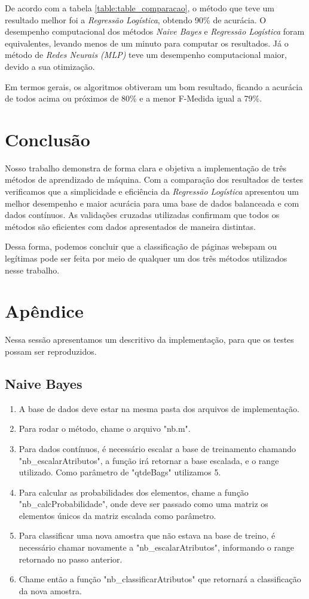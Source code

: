 \documentclass[10pt, conference, compsocconf]{IEEEtran}
\begin{document}
De acordo com a tabela \ref{table:table_comparacao}, o método que teve um resultado melhor foi a \textit{Regressão Logística}, obtendo 90\% de acurácia. O desempenho computacional dos métodos \textit{Naive Bayes} e \textit{Regressão Logística} foram equivalentes, levando menos de um minuto para computar os resultados. Já o método de \textit{Redes Neurais (MLP)} teve um desempenho computacional maior, devido a sua otimização.

Em termos gerais, os algoritmos obtiveram um bom resultado, ficando a acurácia de todos acima ou próximos de 80\% e a menor F-Medida igual a 79\%.


\section{Conclusão}\label{conclusao}
Nosso trabalho demonstra de forma clara e objetiva a implementação de três métodos de aprendizado de máquina. Com a comparação dos resultados de testes verificamos que a simplicidade e eficiência da \textit{Regressão Logística} apresentou um melhor desempenho e maior acurácia para uma base de dados balanceada e com dados contínuos. As validações cruzadas utilizadas confirmam que todos os métodos são eficientes com dados apresentados de maneira distintas.

Dessa forma, podemos concluir que a classificação de páginas webspam ou legítimas pode ser feita por meio de qualquer um dos três métodos utilizados nesse trabalho.





\newpage
\section{Apêndice}
Nessa sessão apresentamos um descritivo da implementação, para que os testes possam ser reproduzidos.

\subsection{Naive Bayes}
\begin{enumerate}
\item A base de dados deve estar na mesma pasta dos arquivos de implementação.
\item Para rodar o método, chame o arquivo "nb.m".
\item Para dados contínuos, é necessário escalar a base de treinamento chamando "nb\_escalarAtributos", a função irá retornar a base escalada, e o range utilizado. Como parâmetro de "qtdeBags" utilizamos 5.
\item Para calcular as probabilidades dos elementos, chame a função "nb\_calcProbabilidade", onde deve ser passado como uma matriz os elementos únicos da matriz escalada como parâmetro.
\item Para classificar uma nova amostra que não estava na base de treino, é necessário chamar novamente a "nb\_escalarAtributos", informando o range retornado no passo anterior.
\item Chame então a função "nb\_classificarAtributos" que retornará a classificação da nova amostra.
\end{enumerate}
\end{document}
